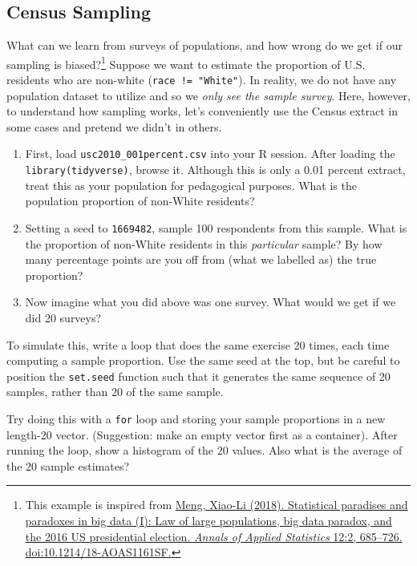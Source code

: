 \documentclass[]{book}
\let\rmarkdownfootnote\footnote%
\def\footnote{\protect\rmarkdownfootnote}
\theoremstyle{definition}
\theoremstyle{definition}
\theoremstyle{definition}
\theoremstyle{remark}
\begin{document}
\subsection*{Census Sampling}\label{census-sampling}

What can we learn from surveys of populations, and how wrong do we get
if our sampling is biased?\footnote{This example is inspired from
  \href{https://statistics.fas.harvard.edu/files/statistics-2/files/statistical_paradises_and_paradoxes.pdf}{Meng,
  Xiao-Li (2018). Statistical paradises and paradoxes in big data (I):
  Law of large populations, big data paradox, and the 2016 US
  presidential election. \emph{Annals of Applied Statistics} 12:2,
  685--726. doi:10.1214/18-AOAS1161SF.}} Suppose we want to estimate the
proportion of U.S. residents who are non-white
(\texttt{race\ !=\ "White"}). In reality, we do not have any population
dataset to utilize and so we \emph{only see the sample survey}. Here,
however, to understand how sampling works, let's conveniently use the
Census extract in some cases and pretend we didn't in others.

\begin{enumerate}
\def\labelenumi{(\alph{enumi})}
\item
  First, load \texttt{usc2010\_001percent.csv} into your R session.
  After loading the \texttt{library(tidyverse)}, browse it. Although
  this is only a 0.01 percent extract, treat this as your population for
  pedagogical purposes. What is the population proportion of non-White
  residents?
\item
  Setting a seed to \texttt{1669482}, sample 100 respondents from this
  sample. What is the proportion of non-White residents in this
  \emph{particular} sample? By how many percentage points are you off
  from (what we labelled as) the true proportion?
\item
  Now imagine what you did above was one survey. What would we get if we
  did 20 surveys?
\end{enumerate}

To simulate this, write a loop that does the same exercise 20 times,
each time computing a sample proportion. Use the same seed at the top,
but be careful to position the \texttt{set.seed} function such that it
generates the same sequence of 20 samples, rather than 20 of the same
sample.

Try doing this with a \texttt{for} loop and storing your sample
proportions in a new length-20 vector. (Suggestion: make an empty vector
first as a container). After running the loop, show a histogram of the
20 values. Also what is the average of the 20 sample estimates?
\end{document}
